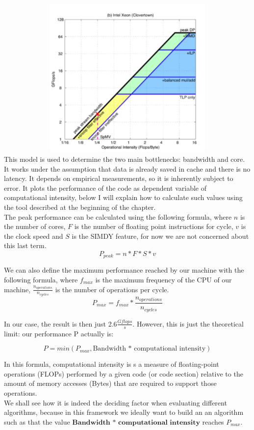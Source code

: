 \documentclass[11pt,a4paper,oneside,titlepage,openright]{book}
\begin{document}
\includegraphics[width=15cm, height=8cm]{roof_example}
\\This model is used to determine the two main bottlenecks: bandwidth and core. It works under the assumption that data is already saved in cache and there  is no latency. It depends on empirical measurements, so it is inherently subject to error. 
It plots the performance of the code as dependent variable of computational intensity, below I will explain how to calculate such values using the tool described at the beginning of the chapter. 
\\
The peak performance can be calculated using the following formula, where $n$ is the number of cores, $F$ is the number of floating point instructions for cycle, $v$ is the clock speed and $S$ is the SIMDY feature, for now we are not concerned about this last term. 
$$ P_{peak} = n * F * S * v $$ 

We can also define the maximum performance reached by our machine with the following formula, where $f_{max}$ is the maximum frequency of the CPU of our machine, $\frac{n_{operations}}{n_{cycles}}$ is the number of operations per cycle. 
$$P_{max} = f_{max} * \frac{n_{operations}}{n_{cycles}}$$ 

In our case, the result is then just 2.6$\frac{Gflops}{s}$.
However, this is just the theoretical limit: our performance P actually is: 

$$ P = min(P_{max}, \text{Bandwidth * computational intensity}) $$

In this formula, computational intensity is s a measure of floating-point operations (FLOPs) performed by a given code (or code section) relative to the amount of memory accesses (Bytes) that are required to support those operations. \\
We shall see how it is indeed the deciding factor when evaluating different algorithms, because in this framework we ideally want to build an an algorithm such as that the value $\textbf{Bandwidth * computational intensity}$ reaches $P_{max}$.\\
\end{document}
